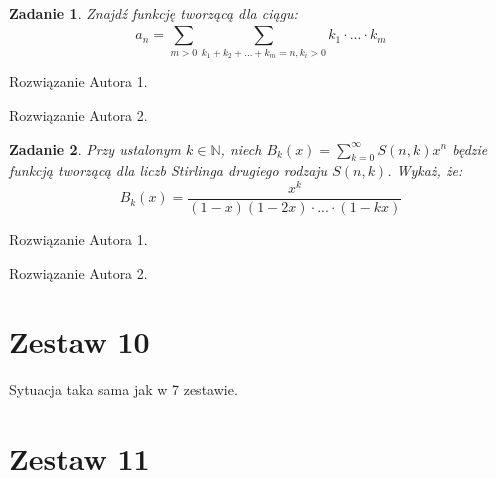 \documentclass{mwart}
\newcommand{\N}{\mathbb{N}}
\newtheorem{zad}{Zadanie}[section]
\begin{document}
\begin{zad}
    Znajdź funkcję tworzącą dla ciągu:
    \[a_n = \sum_{m>0}^{}\sum_{k_1+k_2+...+k_m = n, k_i>0}^{}k_1 \cdot ... \cdot k_m\]
\end{zad}
\begin{mdframed}
    Rozwiązanie Autora 1.
\end{mdframed}
\begin{mdframed}
    Rozwiązanie Autora 2.
\end{mdframed}

\begin{zad}
    Przy ustalonym $k \in \N$, niech $B_k(x) = \sum_{k=0}^{\infty}S(n, k)x^n$ będzie funkcją
    tworzącą dla liczb Stirlinga drugiego rodzaju $S(n, k)$. Wykaż, że:
    \[B_k(x) = \frac{x^k}{(1-x)(1-2x) \cdot ... \cdot (1-kx)}\]
\end{zad}
\begin{mdframed}
    Rozwiązanie Autora 1.
\end{mdframed}
\begin{mdframed}
    Rozwiązanie Autora 2.
\end{mdframed}


















\newpage
\section{Zestaw 10}          %
Sytuacja taka sama jak w 7 zestawie.












\newpage
\section{Zestaw 11}          %
\end{document}
